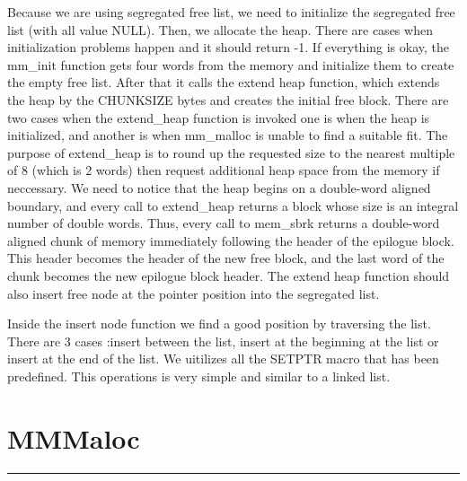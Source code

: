 \documentclass[a4paper]{article}
\begin{document}
Because we are using segregated free list, we need to initialize the segregated free list (with all value NULL). Then, we allocate the heap. There are cases when initialization problems happen and it should return -1. If everything is okay, the mm\_init function gets four words from the memory and initialize them to create the empty free list. After that it calls the extend heap function, which extends the heap by the CHUNKSIZE bytes and creates the initial free block. There are two cases when the extend\_heap function is invoked  one is when the heap is initialized, and another is when mm\_malloc is unable to find a suitable fit. The purpose of extend\_heap is to round up the requested size to the nearest multiple of 8 (which is 2 words) then request additional heap space from the memory if neccessary. We need to notice that the heap begins on a double-word aligned boundary, and every call to extend\_heap returns a block whose size is an integral number of double words. Thus, every call to mem\_sbrk returns a double-word aligned chunk of memory immediately following the header of the epilogue block. This header becomes the header of the new free block, and the last word of the chunk becomes the new epilogue block header.  The extend heap function should also insert free node at the pointer position into the segregated list.

 
  
  
Inside the insert node function we find a good position by traversing the list. There are 3 cases :insert between the list, insert at the beginning at the list or insert at the end of the list. We uitilizes all the SETPTR macro that has been predefined. This operations is very simple and similar to a linked list.  



 
\section{MMMaloc}
\noindent\rule{2cm}{0.4pt}
\end{document}
